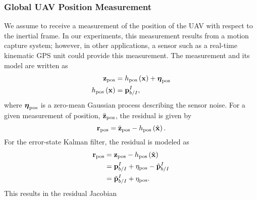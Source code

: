 \subsubsection{Global UAV Position Measurement}
We assume to receive a measurement of the position of the UAV with respect to
the inertial frame.
In our experiments, this measurement results from a motion capture system;
however, in other applications,
a sensor such as a real-time kinematic GPS unit could provide this measurement.
The measurement and its model are
written as
\begin{align}
  \boldsymbol{\mathrm{z}}_{\text{pos}} &= h_{\text{pos}} \left( \boldsymbol{\mathrm{x}} \right) + \boldsymbol{\mathrm{\eta}}_{\text{pos}} \\
  h_{\text{pos}} \left( \boldsymbol{\mathrm{x}} \right) &= \boldsymbol{\mathrm{p}}_{b/I}^I,
\end{align}
where $\boldsymbol{\mathrm{\eta}}_{\text{pos}}$ is a zero-mean Gaussian process
describing the sensor noise.
For a given measurement of position, $\bar{\boldsymbol{\mathrm{z}}}_{\text{pos}}$, the residual is
given by
\begin{equation}
  \boldsymbol{\mathrm{r}}_{\text{pos}} = \bar{\boldsymbol{\mathrm{z}}}_{\text{pos}} - h_{\text{pos}} \left( \hat{\boldsymbol{\mathrm{x}}}
  \right).
\end{equation}
For the error-state Kalman filter, the residual is modeled as
\begin{align}
  \boldsymbol{\mathrm{r}}_{\text{pos}} &=  \boldsymbol{\mathrm{z}}_{\text{pos}} - h_{\text{pos}} \left( \hat{\boldsymbol{\mathrm{x}}}
  \right) \\
                        &= \boldsymbol{\mathrm{p}}_{b/I}^I + \eta_{\text{pos}} -
                        \hat{\boldsymbol{\mathrm{p}}}_{b/I}^I \\
                        &= \tilde{\boldsymbol{\mathrm{p}}}_{b/I}^I + \eta_{\text{pos}}.
\end{align}
This results in the residual Jacobian
